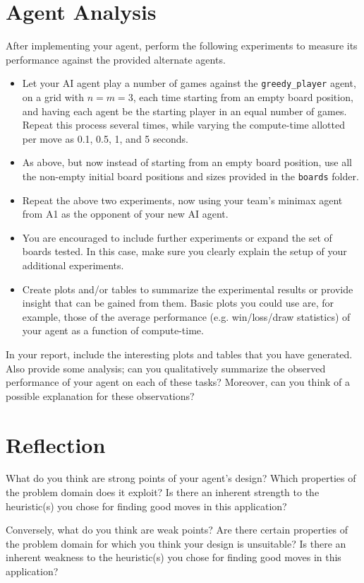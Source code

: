 \documentclass[11pt]{article}
\begin{document}
\section{Agent Analysis}\label{sec:analysis}
After implementing your agent, perform the following experiments to measure its performance against the provided alternate agents.
\begin{itemize}
	\item Let your AI agent play a number of games against the \texttt{greedy\_player} agent, on a grid with $n=m=3$, each time starting from an empty board position, and having each agent be the starting player in an equal number of games. Repeat this process several times, while varying the compute-time allotted per move as 0.1, 0.5, 1, and 5 seconds.
	\item As above, but now instead of starting from an empty board position, use all the non-empty initial board positions and sizes provided in the \texttt{boards} folder.
	\item Repeat the above two experiments, now using your team's minimax agent from A1 as the opponent of your new AI agent.
	\item You are encouraged to include further experiments or expand the set of boards tested. In this case, make sure you clearly explain the setup of your additional experiments.
	\item Create plots and/or tables to summarize the experimental results or provide insight that can be gained from them.
	Basic plots you could use are, for example, those of the average performance (e.g. win/loss/draw statistics) of your agent as a function of compute-time.
\end{itemize}

In your report, include the interesting plots and tables that you have generated.
Also provide some analysis; can you qualitatively summarize the observed performance of your agent on each of these tasks?
Moreover, can you think of a possible explanation for these observations?


\section{Reflection}\label{sec:reflect}
What do you think are strong points of your agent's design?
Which properties of the problem domain does it exploit?
Is there an inherent strength to the heuristic(s) you chose for finding good moves in this application?

Conversely, what do you think are weak points?
Are there certain properties of the problem domain for which you think your design is unsuitable?
Is there an inherent weakness to the heuristic(s) you chose for finding good moves in this application?
\end{document}
